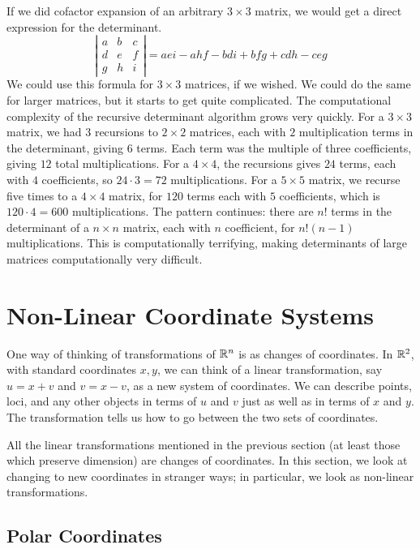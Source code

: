 \documentclass[fleqn,letterpaper]{report}
\begin{document}
If we did cofactor expansion of an arbitrary $3 \times 3$
matrix, we would get a direct expression for the
determinant.
\begin{equation*}
\left| \begin{matrix}
a & b & c \\ d & e & f \\ g & h & i
\end{matrix} \right| = aei - ahf - bdi + bfg + cdh - ceg
\end{equation*}
We could use this formula for $3 \times 3$ matrices, if we
wished. We could do the same for larger matrices, but it
starts to get quite complicated. The computational complexity
of the recursive determinant algorithm grows very quickly. For
a $3 \times 3$ matrix, we had 3 recursions to $2 \times 2$
matrices, each with $2$ multiplication terms in the
determinant, giving $6$ terms. Each term was the multiple of
three coefficients, giving $12$ total multiplications. For a
$4 \times 4$, the recursions gives $24$ terms, each with $4$
coefficients, so $24\cdot 3 = 72$ multiplications. For a $5
\times 5$ matrix, we recurse five times to a $4 \times 4$
matrix, for $120$ terms each with $5$ coefficients, which is
$120 \cdot 4 = 600$ multiplications. The pattern continues:
there are $n!$ terms in the determinant of a $n \times n$
matrix, each with $n$ coefficient, for $n! (n-1)$
multiplications. This is computationally terrifying, making
determinants of large matrices computationally very difficult.

\chapter{Non-Linear Coordinate Systems}
\label{non-linear-coordinates}

One way of thinking of transformations of $\mathbb{R}^n$ is as
changes of coordinates.  In $\mathbb{R}^2$, with standard coordinates
$x,y$, we can think of a linear transformation, say $u = x+v$
and $v=x-v$, as a new system of coordinates. We can describe
points, loci, and any other objects in terms of $u$ and
$v$ just as well as in terms of $x$ and $y$. The
transformation tells us how to go between the two sets of
coordinates. 

All the linear transformations mentioned in the previous
section (at least those which preserve dimension) are changes
of coordinates. In this section, we look at changing to new
coordinates in stranger ways; in particular, we look as
non-linear transformations.

\section{Polar Coordinates}
\label{polar-coordinates}
\end{document}
